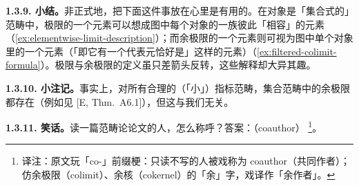 \textbf{1.3.9. 小结。}\quad 非正式地，把下面这件事放在心里是有用的。在对象是「集合式的」范畴中，极限的一个元素可以想成图中每个对象的一族彼此「相容」的元素（\cref{ex:elementwise-limit-description}）；而余极限的一个元素则可视为图中单个对象里的一个元素（「即它有一个代表元恰好是」这样的元素）（\cref{ex:filtered-colimit-formula}）。极限与余极限的定义虽只差箭头反转，这些解释却大异其趣。

\textbf{1.3.10. 小注记。}\quad 事实上，对所有合理的（「小」）指标范畴，集合范畴中的余极限都存在（例如见 [E, Thm.~A6.1]），但这与我们无关。

\textbf{1.3.11. 笑话。}\quad 读一篇范畴论论文的人，怎么称呼？答案：\trCoauthor{}（coauthor）%
\footnote{译注：原文玩「co-」前缀梗：只读不写的人被戏称为 coauthor（共同作者）；仿余极限（colimit）、余核（cokernel）的「余」字，戏译作「余作者」。}。


